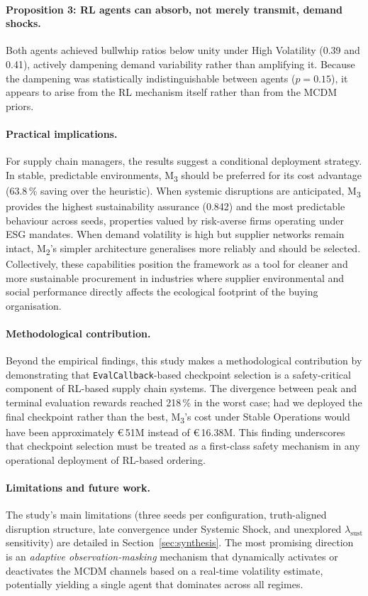 \documentclass[preprint,12pt]{elsarticle}
\begin{document}
\paragraph{Proposition 3: RL agents can absorb, not merely transmit, demand shocks.}
Both agents achieved bullwhip ratios below unity under High Volatility (0.39 and 0.41), actively dampening demand variability rather than amplifying it. Because the dampening was statistically indistinguishable between agents ($p = 0.15$), it appears to arise from the RL mechanism itself rather than from the MCDM priors.

\paragraph{Practical implications.}
For supply chain managers, the results suggest a conditional deployment strategy.
In stable, predictable environments, M\textsubscript{3} should be preferred for its cost advantage (63.8\,\% saving over the heuristic).
When systemic disruptions are anticipated, M\textsubscript{3} provides the highest sustainability assurance (0.842) and the most predictable behaviour across seeds, properties valued by risk-averse firms operating under ESG mandates.
When demand volatility is high but supplier networks remain intact, M\textsubscript{2}'s simpler architecture generalises more reliably and should be selected.
Collectively, these capabilities position the framework as a tool for cleaner and more sustainable procurement in industries where supplier environmental and social performance directly affects the ecological footprint of the buying organisation.

\paragraph{Methodological contribution.}
Beyond the empirical findings, this study makes a methodological contribution by demonstrating that \texttt{EvalCallback}-based checkpoint selection is a safety-critical component of RL-based supply chain systems.
The divergence between peak and terminal evaluation rewards reached 218\,\% in the worst case; had we deployed the final checkpoint rather than the best, M\textsubscript{3}'s cost under Stable Operations would have been approximately \euro\,51M instead of \euro\,16.38M.
This finding underscores that checkpoint selection must be treated as a first-class safety mechanism in any operational deployment of RL-based ordering.

\paragraph{Limitations and future work.}
The study's main limitations (three seeds per configuration, truth-aligned disruption structure, late convergence under Systemic Shock, and unexplored $\lambda_{\text{sust}}$ sensitivity) are detailed in Section~\ref{sec:synthesis}.
The most promising direction is an \emph{adaptive observation-masking} mechanism that dynamically activates or deactivates the MCDM channels based on a real-time volatility estimate, potentially yielding a single agent that dominates across all regimes.
\end{document}
